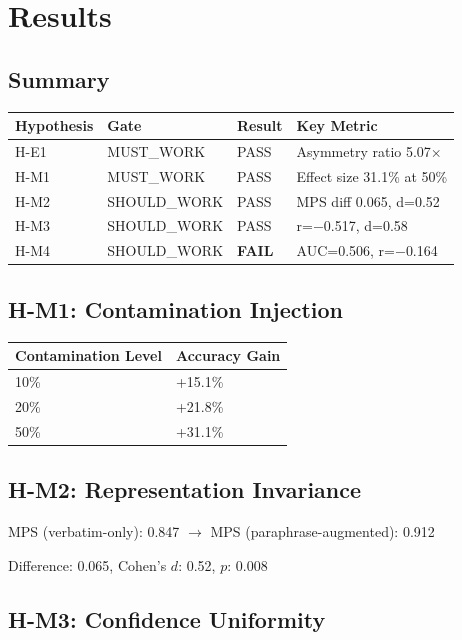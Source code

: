 \section{Results}

\subsection{Summary}

\begin{table}[h]
\centering
\begin{tabular}{@{}llll@{}}
\toprule
Hypothesis & Gate & Result & Key Metric \\
\midrule
H-E1 & MUST\_WORK & PASS & Asymmetry ratio 5.07$\times$ \\
H-M1 & MUST\_WORK & PASS & Effect size 31.1\% at 50\% \\
H-M2 & SHOULD\_WORK & PASS & MPS diff 0.065, d=0.52 \\
H-M3 & SHOULD\_WORK & PASS & r=$-$0.517, d=0.58 \\
H-M4 & SHOULD\_WORK & \textbf{FAIL} & AUC=0.506, r=$-$0.164 \\
\bottomrule
\end{tabular}
\end{table}

\subsection{H-M1: Contamination Injection}

\begin{table}[h]
\centering
\begin{tabular}{@{}ll@{}}
\toprule
Contamination Level & Accuracy Gain \\
\midrule
10\% & +15.1\% \\
20\% & +21.8\% \\
50\% & +31.1\% \\
\bottomrule
\end{tabular}
\end{table}

\subsection{H-M2: Representation Invariance}

MPS (verbatim-only): 0.847 $\rightarrow$ MPS (paraphrase-augmented): 0.912

Difference: 0.065, Cohen's $d$: 0.52, $p$: 0.008

\subsection{H-M3: Confidence Uniformity}

